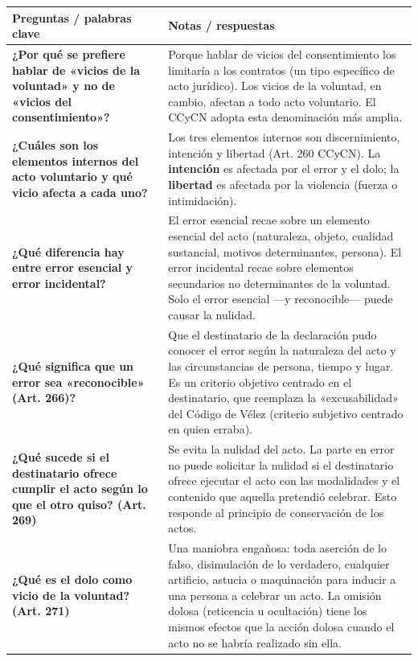 \documentclass[12pt,oneside]{book}
\begin{document}
\begin{table}[H]
\centering
\begin{tabularx}{\textwidth}{
    >{\raggedright\arraybackslash}p{}
    >{\raggedright\arraybackslash}X
}
\toprule
\textbf{Preguntas / palabras clave} & \textbf{Notas / respuestas} \\
\midrule

\textbf{¿Por qué se prefiere hablar de «vicios de la voluntad» y no de «vicios del consentimiento»?} &
Porque hablar de vicios del consentimiento los limitaría a los contratos (un tipo específico de acto jurídico). Los vicios de la voluntad, en cambio, afectan a todo acto voluntario. El CCyCN adopta esta denominación más amplia. \\[6pt]

\textbf{¿Cuáles son los elementos internos del acto voluntario y qué vicio afecta a cada uno?} &
Los tres elementos internos son discernimiento, intención y libertad (Art. 260 CCyCN). La \textbf{intención} es afectada por el error y el dolo; la \textbf{libertad} es afectada por la violencia (fuerza o intimidación). \\[6pt]

\textbf{¿Qué diferencia hay entre error esencial y error incidental?} &
El error esencial recae sobre un elemento esencial del acto (naturaleza, objeto, cualidad sustancial, motivos determinantes, persona). El error incidental recae sobre elementos secundarios no determinantes de la voluntad. Solo el error esencial ---y reconocible--- puede causar la nulidad. \\[6pt]

\textbf{¿Qué significa que un error sea «reconocible» (Art. 266)?} &
Que el destinatario de la declaración pudo conocer el error según la naturaleza del acto y las circunstancias de persona, tiempo y lugar. Es un criterio objetivo centrado en el destinatario, que reemplaza la «excusabilidad» del Código de Vélez (criterio subjetivo centrado en quien erraba). \\[6pt]

\textbf{¿Qué sucede si el destinatario ofrece cumplir el acto según lo que el otro quiso? (Art. 269)} &
Se evita la nulidad del acto. La parte en error no puede solicitar la nulidad si el destinatario ofrece ejecutar el acto con las modalidades y el contenido que aquella pretendió celebrar. Esto responde al principio de conservación de los actos. \\[6pt]

\textbf{¿Qué es el dolo como vicio de la voluntad? (Art. 271)} &
Una maniobra engañosa: toda aserción de lo falso, disimulación de lo verdadero, cualquier artificio, astucia o maquinación para inducir a una persona a celebrar un acto. La omisión dolosa (reticencia u ocultación) tiene los mismos efectos que la acción dolosa cuando el acto no se habría realizado sin ella. \\[6pt]


\end{tabularx}
\end{table}
\end{document}
